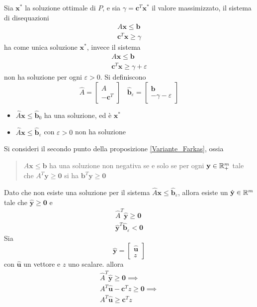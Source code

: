 \documentclass[10pt, letterpaper]{report}
\newcommand{\bb}{{\mathbf{b}}}
\newcommand{\bc}{{\mathbf{c}}}
\newcommand{\x}{{\mathbf{x}}}
\newcommand{\y}{{\mathbf{y}}}
\begin{document}
Sia $\x^*$ la soluzione ottimale di $P$, e sia $\gamma = \bc^T\x^*$ il valore massimizzato, il sistema di disequazioni\begin{eqnarray*}
    A\x\le\bb\\ \bc^T\x\ge \gamma  
\end{eqnarray*}
ha come unica soluzione $\x^*$, invece il sistema\begin{eqnarray*}
    A\x\le\bb\\ \bc^T\x\ge \gamma  + \varepsilon 
\end{eqnarray*}
non ha soluzione per ogni $\varepsilon > 0$. Si definiscono \begin{equation}
    \hat A = \begin{bmatrix}
        A \\ -\bc^T 
    \end{bmatrix} \ \ \ \  
    \hat \bb_\varepsilon = \begin{bmatrix}
        \bb \\ -\gamma-\varepsilon
    \end{bmatrix}
\end{equation}\begin{itemize}
    \item $\hat A\x\le \hat\bb_0$ ha una soluzione, ed è $\x^*$
    \item $\hat A\x\le \hat\bb_\varepsilon$ con $\varepsilon>0$ non ha soluzione
\end{itemize}
Si consideri il secondo punto della proposizione \ref{Variante_Farkas}, ossia 
\begin{quote}
    $A\x\le \bb$ ha una soluzione non negativa se e solo se per ogni  $\y \in \R^m_+$ tale che $A^T\y\ge \mathbf 0$ si ha $\bb^T\y\ge \mathbf 0$
\end{quote}
Dato che non esiste una soluzione per il sistema $\hat A\x\le \hat\bb_\varepsilon$, allora esiste un $\hat\y\in\R^m$ tale che $\hat \y\ge\mathbf 0$ e \begin{eqnarray}
    \hat A^T\hat\y\ge\mathbf 0 \\ 
    \hat\y^T\hat\bb_\varepsilon<\mathbf 0
\end{eqnarray}
Sia $$ \hat\y = \begin{bmatrix}
    \hat{\mathbf u} \\ z 
\end{bmatrix}$$
con $ \hat{\mathbf u}$ un vettore e $z$ uno scalare. allora \begin{eqnarray}
    \hat A^T\hat\y\ge\mathbf 0 \implies \\ 
    A^T\hat{\mathbf u}-\bc^Tz\ge \mathbf 0\implies\\ 
    A^T\hat{\mathbf u}\ge \bc^Tz
\end{eqnarray}
\end{document}
